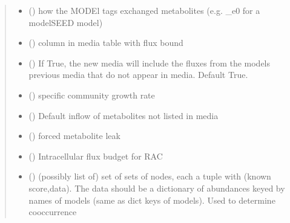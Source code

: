 \documentclass[letterpaper,10pt,english]{sphinxmanual}
\begin{document}
\begin{fulllineitems}
\begin{quote}
\begin{description}
\begin{itemize}
\item {} 
\sphinxAtStartPar
{} () \textendash{} how the MODEl tags exchanged metabolites (e.g. \_e0 for a modelSEED model)

\item {} 
\sphinxAtStartPar
{} () \textendash{} column in media table with flux bound

\item {} 
\sphinxAtStartPar
{} () \textendash{} If True, the new media will include the fluxes from the models previous media that do not appear in media. Default True.

\item {} 
\sphinxAtStartPar
{} () \textendash{} specific community growth rate

\item {} 
\sphinxAtStartPar
{} () \textendash{} Default inflow of metabolites not listed in media

\item {} 
\sphinxAtStartPar
{} () \textendash{} forced metabolite leak

\item {} 
\sphinxAtStartPar
{} () \textendash{} Intracellular flux budget for RAC

\item {} 
\sphinxAtStartPar
{} (\sphinxstyleliteralemphasis{\sphinxupquote{{[}}}\sphinxstyleliteralemphasis{\sphinxupquote{{[}}}\sphinxstyleliteralemphasis{\sphinxupquote{,}}\sphinxstyleliteralemphasis{\sphinxupquote{{]}}}\sphinxstyleliteralemphasis{\sphinxupquote{{]} or }}) \textendash{} (possibly list of) set of sets of nodes, each a tuple with (known score,data). The data should be a dictionary of abundances keyed by names of models (same as dict keys of models). Used to determine co\sphinxhyphen{}occurrence


\end{itemize}
\end{description}
\end{quote}
\end{fulllineitems}
\end{document}
